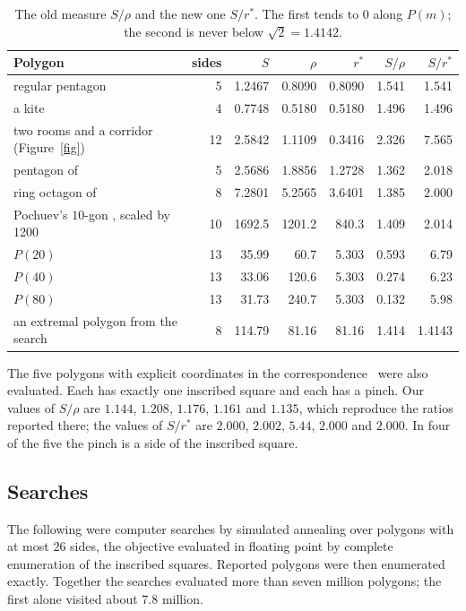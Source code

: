 \documentclass[11pt,a4paper]{article}
\theoremstyle{definition}\newtheorem{definition}{Definition}
\theoremstyle{remark}\newtheorem{remark}{Remark}
\begin{document}
\begin{table}[H]\centering\small
\begin{tabular}{lrrrrrr}
\toprule
Polygon & sides & $S$ & $\rho$ & $r^*$ & $S/\rho$ & $S/r^*$\\
\midrule
regular pentagon & 5 & 1.2467 & 0.8090 & 0.8090 & 1.541 & 1.541\\
a kite & 4 & 0.7748 & 0.5180 & 0.5180 & 1.496 & 1.496\\
two rooms and a corridor (Figure~\ref{fig}) & 12 & 2.5842 & 1.1109 & 0.3416 & 2.326 & 7.565\\
pentagon of \cite[Appendix]{small} & 5 & 2.5686 & 1.8856 & 1.2728 & 1.362 & 2.018\\
ring octagon of \cite[\S4]{small} & 8 & 7.2801 & 5.2565 & 3.6401 & 1.385 & 2.000\\
Pochuev's $10$-gon \cite{pochuev}, scaled by 1200 & 10 & 1692.5 & 1201.2 & 840.3 & 1.409 & 2.014\\
$P(20)$ & 13 & 35.99 & 60.7 & 5.303 & 0.593 & 6.79\\
$P(40)$ & 13 & 33.06 & 120.6 & 5.303 & 0.274 & 6.23\\
$P(80)$ & 13 & 31.73 & 240.7 & 5.303 & 0.132 & 5.98\\
an extremal polygon from the search & 8 & 114.79 & 81.16 & 81.16 & 1.414 & 1.4143\\
\bottomrule
\end{tabular}
\caption{The old measure $S/\rho$ and the new one $S/r^*$. The first tends to
$0$ along $P(m)$; the second is never below $\sqrt2=1.4142$.}\label{tab}
\end{table}

The five polygons with explicit coordinates in the correspondence~\cite{ss} were
also evaluated. Each has exactly one inscribed square and each has a pinch. Our
values of $S/\rho$ are $1.144$, $1.208$, $1.176$, $1.161$ and $1.135$, which
reproduce the ratios reported there; the values of $S/r^*$ are $2.000$, $2.002$,
$5.44$, $2.000$ and $2.000$. In four of the five the pinch is a side of the
inscribed square.

\subsection*{Searches}

The following were computer searches by simulated annealing over polygons with
at most $26$ sides, the objective evaluated in floating point by complete
enumeration of the inscribed squares. Reported polygons were then enumerated
exactly. Together the searches evaluated more than seven million polygons; the
first alone visited about $7.8$ million.
\end{document}
